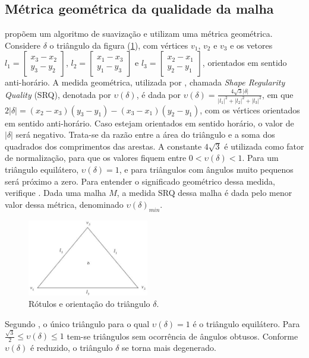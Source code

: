 \subsection{Métrica geométrica da qualidade da malha}
\label{cap_metrica_geometrica}

 propõem um algoritmo de suavização e utilizam uma métrica geométrica. Considere $\delta$ o triângulo da figura (\ref{fig_medida_t}), com vértices $v_1$, $v_2$ e $v_3$ e os vetores $ l_1 = \left[ \begin{array}{c}  x_3 - x_2 \\  y_3 - y_2 \end{array} \right ]$, $l_2 = \left[ \begin{array}{c}  x_1 - x_3 \\  y_1 - y_3 \end{array} \right ]$ e $l_3 = \left[ \begin{array}{c}  x_2 - x_1 \\  y_2 - y_1 \end{array} \right ]$, orientados em sentido anti-horário. A medida geométrica, utilizada por , chamada {\it Shape Regularity Quality} (SRQ), denotada por $\upsilon(\delta)$, é dada por $\upsilon(\delta) = \frac {4 \sqrt{3}|\delta|} {|l_1|^2 + |l_2|^2 + |l_3|^2}$, em que $2|\delta| = (x_2 - x_3)(y_3 - y_1) - (x_3 - x_1)(y_2 - y_1)$, com os vértices orientados em sentido anti-horário. Caso estejam orientados em sentido horário, o valor de $|\delta|$ será negativo. Trata-se da razão entre a área do triângulo e a soma dos quadrados dos comprimentos das arestas. A constante $4\sqrt{3}$ é utilizada como fator de normalização, para que os valores fiquem entre $0 < \upsilon(\delta) < 1$. Para um triângulo equilátero, $\upsilon(\delta) = 1$, e para triângulos com ângulos muito pequenos será próximo a zero. Para entender o significado geométrico dessa medida, verifique . Dada uma malha $M$, a medida SRQ dessa malha é dada pelo menor valor dessa métrica, denominado $\upsilon(\delta)_{min}$.

\begin{figure}[!ht]
  \centering
  \includegraphics[width=150pt]{imagens_malhas_moveis/medida_t.png}
  \caption{\footnotesize{Rótulos e orientação do triângulo $\delta$.
}}
  \label{fig_medida_t}
\end{figure}

Segundo , o único triângulo para o qual $\upsilon (\delta) = 1$ é o triângulo equilátero. Para $\frac{ \sqrt{3} } {2} \leq \upsilon(\delta) \leq 1$ tem-se triângulos sem ocorrência de ângulos obtusos. Conforme $\upsilon(\delta)$ é reduzido, o triângulo $\delta$ se torna mais degenerado.
 
